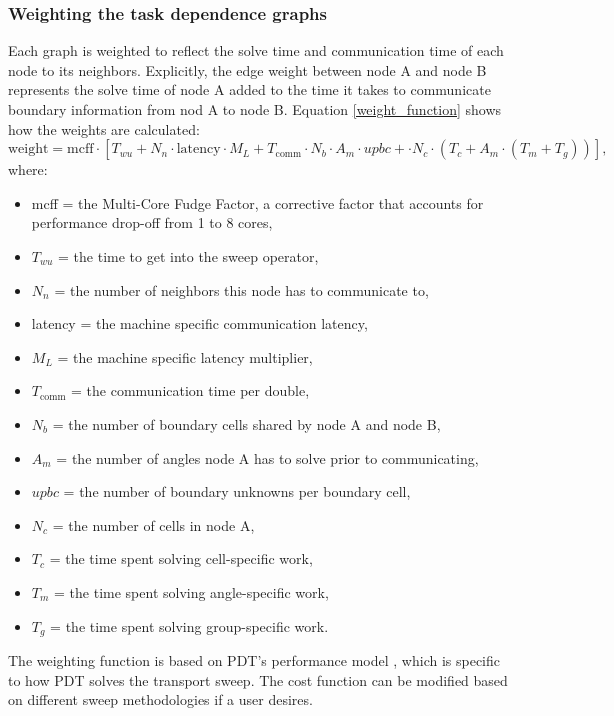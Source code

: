 \documentclass[times,final]{elsarticle}
\begin{document}
\subsubsection{Weighting the task dependence graphs}

Each graph is weighted to reflect the solve time and communication time of each node to its neighbors. Explicitly, the edge weight between node A and node B represents the solve time of node A added to the time it takes to communicate boundary information from nod A to node B. Equation \ref{weight_function} shows how the weights are calculated:
\begin{equation}
\text{weight} = \text{mcff}\cdot [T_{wu} + N_n\cdot \text{latency}\cdot M_L + T_{\text{comm}}\cdot N_b\cdot A_m\cdot upbc + \cdot N_c\cdot (T_c + A_m\cdot (T_m + T_g))],
\label{weight_function}
\end{equation}
where:
\begin{itemize}
  \item mcff = the Multi-Core Fudge Factor, a corrective factor that accounts for performance drop-off from 1 to 8 cores,
  \item $T_{wu}$ = the time to get into the sweep operator,
  \item $N_n$ = the number of neighbors this node has to communicate to,
  \item latency = the machine specific communication latency,
  \item $M_L$ = the machine specific latency multiplier,
  \item $T_{\text{comm}}$ = the communication time per double,
  \item $N_b$ = the number of boundary cells shared by node A and node B,
  \item $A_m$ = the number of angles node A has to solve prior to communicating,
  \item $upbc$ = the number of boundary unknowns per boundary cell,
  \item $N_c$ = the number of cells in node A,
  \item $T_c$ = the time spent solving cell-specific work,
  \item $T_m$ = the time spent solving angle-specific work,
  \item $T_g$ = the time spent solving group-specific work.
\end{itemize}
The weighting function is based on PDT's performance model \cite{mpadams2013,mpadams2015,mpadamsjcp}, which is specific to how PDT solves the transport sweep. The cost function can be modified based on different sweep methodologies if a user desires.
\end{document}
